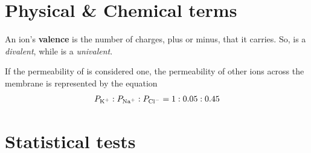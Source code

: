 % 
% 
% 
% 
% 
% 
% 



\section{Physical \& Chemical terms}
\label{sec:physical--chemical}

An ion's {\bf valence} is the number of charges, plus or minus, that
it carries. So,  is a {\it divalent}, while  is a
{\it univalent}.

If the permeability of  is considered one, the permeability of
other ions across the membrane is represented by the equation
\begin{eqnarray}
  \label{eq:539_copy}
  P_{\ce{K+}}:P_{\ce{Na+}}:P_{\ce{Cl-}} = 1:0.05:0.45
\end{eqnarray}

\section{Statistical tests}
\label{sec:statistical-tests}

